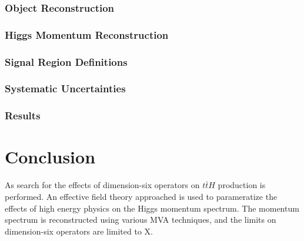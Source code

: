 \documentclass[NOTE, atlasdraft=true, texlive=2016, UKenglish]{\ATLASLATEXPATH atlasdoc}
\begin{document}
\section{Object Reconstruction}
\label{sec:objReco}


\section{Higgs Momentum Reconstruction}
\label{sec:mva}


\section{Signal Region Definitions}
\label{sec:signal_region}


\section{Systematic Uncertainties}
\label{sec:sys}


\section{Results}
\label{sec:results}


\part{Conclusion}
\label{part:conclusion}

As search for the effects of dimension-six operators on $t\bar{t}H$ production is performed. An effective field theory approached is used to parameratize the effects of high energy physics on the Higgs momentum spectrum. The momentum spectrum is reconstructed using various MVA techniques, and the limits on dimension-six operators are limited to X. 
\end{document}
